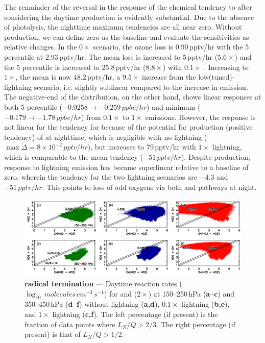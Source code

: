 The remainder of the reversal in the response of the  chemical tendency to {\lnox} after considering the
daytime production is evidently substantial. Due to the absence of photolysis, the nighttime maximum tendencies
are all near zero. Without production, we can define zero as the baseline and evaluate the sensitivities as
relative changes. In the $0\times$ scenario, the ozone loss is 0.90\,\unit{pptv/hr} with the 5 percentile at 2.93\,\unit{pptv/hr}.
The mean loss is increased to 5\,\unit{pptv/hr} ($5.6\times$) and the 5 percentile is increased to 25.8\,\unit{pptv/hr}
($8.8\times$) with $0.1\times$ {\lnox}. Increasing {\lnox} to $1\times$, the mean is now 48.2\,\unit{pptv/hr}, a $9.5\times$
increase from the low(tuned)-lightning scenario, i.e. slightly sublinear compared to the increase in emission. The
negative-end of the distribution, on the other hand, shows linear responses at both 5-percentile ($-0.0258\rightarrow-0.259\,\unit{ppbv/hr}$)
and minimum ($-0.179\rightarrow-1.78\,\unit{ppbv/hr}$) from $0.1\times$ to $1\times$ emissions. However, the response
is not linear for the tendency for  because of the potential for production (positive tendency) of 
at nighttime, which is negligible with no lightning ($\max\Delta = 8\times10^{-2}\,\unit{pptv/hr}$), but increases to 79\,\unit{pptv/hr}
with $1\times$ lightning, which is comparable to the mean tendency ($-51\,\unit{pptv/hr}$). Despite production, response
to lightning emission has became superlinear relative to a baseline of zero, wherein the  tendency for
the two lightning scenarios are $-4.3$ and $-51\,\unit{pptv/hr}$. This points to loss of odd oxygens via both  and
 pathways at night.

	\begin{figure}[t!]
		\centering
		\includegraphics[width=1.0\textwidth]{sens/rxn}
		\caption[ radical termination]{\label{fig:2006/ltngsens_rxn}\textbf{ radical termination}
		--- Daytime reaction rates ($\log_{10}\,\unit{molecules\,cm^{-3}\,s^{-1}}$) for  and ($2\times$)
		 at 150--250\,\unit{hPa} ({\bf a--c}) and 350--450\,\unit{hPa} ({\bf d--f}) without lightning ({\bf a,d}),
		$0.1\times$ lightning ({\bf b,e}), and $1\times$ lightning ({\bf c,f}). The left percentage (if present) is the fraction
		of data points where $L_N/Q>2/3$. The right percentage (if present) is that of $L_N/Q>1/2$.}\vspace{-.3in}
	\end{figure}

